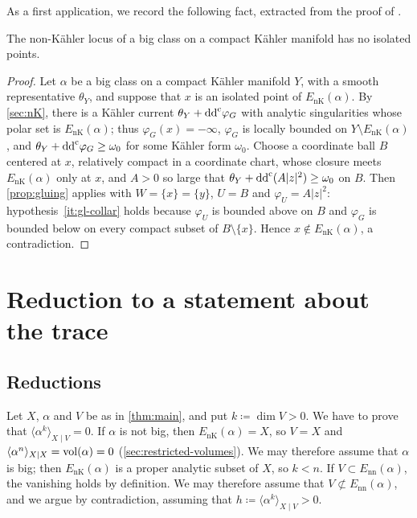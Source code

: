 \documentclass[11pt,a4paper]{amsart}
\newcommand{\EnK}{E_{\mathrm{nK}}}
\newcommand{\Enn}{E_{\mathrm{nn}}}
\theoremstyle{definition}
\begin{document}
As a first application, we record the following fact, extracted from the
proof of \cite[Lemma~3.1]{CT15}.

\begin{lemma}\label{lem:no-isolated-points}
The non-K\"ahler locus of a big class on a compact K\"ahler manifold has
no isolated points.
\end{lemma}

\begin{proof}
Let $\alpha$ be a big class on a compact K\"ahler manifold $Y$, with a
smooth representative $\theta_Y$, and suppose that $x$ is an isolated
point of $\EnK(\alpha)$. By \cref{sec:nK}, there is a K\"ahler current
$\theta_Y+\mathrm{dd}^{\mathrm{c}}\varphi_G$ with analytic singularities whose polar set is
$\EnK(\alpha)$; thus $\varphi_G(x)=-\infty$, $\varphi_G$ is locally
bounded on $Y\setminus\EnK(\alpha)$, and $\theta_Y+\mathrm{dd}^{\mathrm{c}}\varphi_G\ge\omega_0$
for some K\"ahler form $\omega_0$. Choose a coordinate ball $B$ centered at
$x$, relatively compact in a coordinate chart, whose closure meets
$\EnK(\alpha)$ only at $x$, and $A>0$ so large that
$\theta_Y+\mathrm{dd}^{\mathrm{c}}(A|z|^2)\ge\omega_0$ on $B$. Then
\cref{prop:gluing} applies with $W=\{x\}=\{y\}$, $U=B$ and
$\varphi_U=A|z|^2$: hypothesis~\ref{it:gl-collar} holds because
$\varphi_U$ is bounded above on $B$ and $\varphi_G$ is bounded below on
every compact subset of $B\setminus\{x\}$. Hence
$x\notin\EnK(\alpha)$, a contradiction.
\end{proof}

\section{Reduction to a statement about the trace}\label{sec:setup}

\subsection{Reductions}

Let $X$, $\alpha$ and $V$ be as in \cref{thm:main}, and put
$k\coloneqq \dim V>0$. We have to prove that
$\langle\alpha^k\rangle_{X\mid V}=0$. If $\alpha$ is not big, then
$\EnK(\alpha)=X$, so $V=X$ and
$\langle\alpha^n\rangle_{X\mid X}=\operatorname{vol}(\alpha)=0$
(\cref{sec:restricted-volumes}). We may therefore assume that $\alpha$ is
big; then $\EnK(\alpha)$ is a proper analytic subset of $X$, so $k<n$. If
$V\subset\Enn(\alpha)$, the vanishing holds by definition. We may
therefore assume that $V\not\subset\Enn(\alpha)$, and we argue by
contradiction, assuming that $h\coloneqq \langle\alpha^k\rangle_{X\mid V}>0$.
\end{document}

